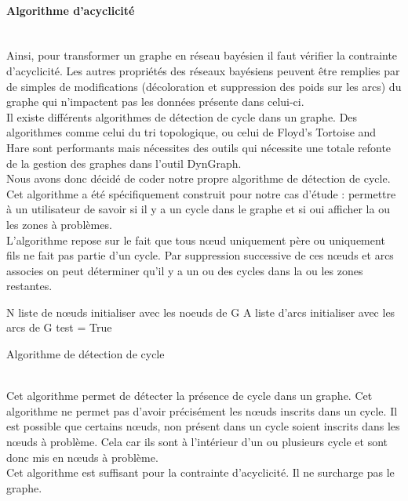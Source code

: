 \documentclass[conference]{IEEEtran}
\begin{document}
\paragraph{Algorithme d'acyclicité} 
\\
Ainsi, pour transformer un graphe en réseau bayésien il faut vérifier la contrainte d'acyclicité. Les autres propriétés des réseaux bayésiens peuvent être remplies par de simples de modifications (décoloration et suppression des poids sur les arcs) du graphe qui n'impactent pas les données présente dans celui-ci. \\
Il existe différents algorithmes de détection de cycle dans un graphe. Des algorithmes comme celui du tri topologique, ou celui de Floyd's Tortoise and Hare sont performants mais nécessites des outils qui nécessite une totale refonte de la gestion des graphes dans l'outil DynGraph. \\
Nous avons donc décidé de coder notre propre algorithme de détection de cycle. Cet algorithme a été spécifiquement construit pour notre cas d'étude : permettre à un utilisateur de savoir si il y a un cycle dans le graphe et si oui afficher la ou les zones à problèmes. \\
L'algorithme repose sur le fait que tous nœud uniquement père ou uniquement fils ne fait pas partie d'un cycle. Par suppression successive de ces nœuds et arcs associes on peut déterminer qu'il y a un ou des cycles dans la ou les zones restantes.  \\

 \begin{algorithm}[H]
 N liste de nœuds initialiser avec les noeuds de G\;
 A liste d'arcs initialiser avec les arcs de G\;
 test = True\;
 \caption{Algorithme de détection de cycle}
\end{algorithm}
\\
Cet algorithme permet de détecter la présence de cycle dans un graphe. Cet algorithme ne permet pas d'avoir précisément les nœuds inscrits dans un cycle. Il est possible que certains nœuds, non présent dans un cycle soient inscrits dans les nœuds à problème. Cela car ils sont à l'intérieur d'un ou plusieurs cycle et sont donc mis en nœuds à problème. \\
Cet algorithme est suffisant pour la contrainte d'acyclicité. Il ne surcharge pas le graphe.
\end{document}
